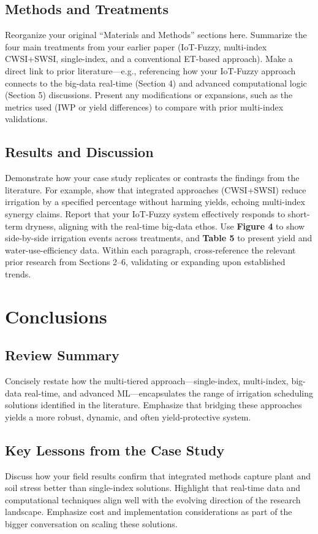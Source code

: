 \documentclass[12pt]{article}
\begin{document}
\subsection{Methods and Treatments}
Reorganize your original “Materials and Methods” sections here. Summarize the four main treatments from your earlier paper (IoT-Fuzzy, multi-index CWSI+SWSI, single-index, and a conventional ET-based approach). Make a direct link to prior literature—e.g., referencing how your IoT-Fuzzy approach connects to the big-data real-time (Section 4) and advanced computational logic (Section 5) discussions. Present any modifications or expansions, such as the metrics used (IWP or yield differences) to compare with prior multi-index validations.

\subsection{Results and Discussion}
Demonstrate how your case study replicates or contrasts the findings from the literature. For example, show that integrated approaches (CWSI+SWSI) reduce irrigation by a specified percentage without harming yields, echoing multi-index synergy claims. Report that your IoT-Fuzzy system effectively responds to short-term dryness, aligning with the real-time big-data ethos. Use \textbf{Figure 4} to show side-by-side irrigation events across treatments, and \textbf{Table 5} to present yield and water-use-efficiency data. Within each paragraph, cross-reference the relevant prior research from Sections 2–6, validating or expanding upon established trends.



\section{Conclusions}

\subsection{Review Summary}
Concisely restate how the multi-tiered approach—single-index, multi-index, big-data real-time, and advanced ML—encapsulates the range of irrigation scheduling solutions identified in the literature. Emphasize that bridging these approaches yields a more robust, dynamic, and often yield-protective system.

\subsection{Key Lessons from the Case Study}
Discuss how your field results confirm that integrated methods capture plant and soil stress better than single-index solutions. Highlight that real-time data and computational techniques align well with the evolving direction of the research landscape. Emphasize cost and implementation considerations as part of the bigger conversation on scaling these solutions.
\end{document}
